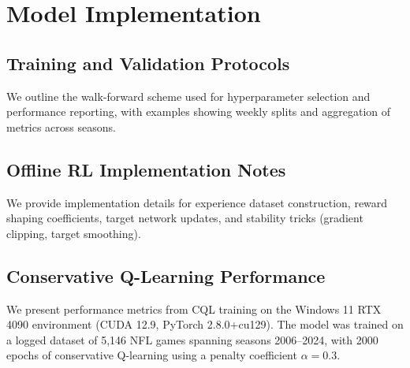 \chapter{Model Implementation}\label{app:models}


\section{Training and Validation Protocols}\label{app:training}
We outline the walk-forward scheme used for hyperparameter selection and performance reporting, with examples showing weekly splits and aggregation of metrics across seasons.

\section{Offline RL Implementation Notes}\label{app:rl-impl}
We provide implementation details for experience dataset construction, reward shaping coefficients, target network updates, and stability tricks (gradient clipping, target smoothing).

\section{Conservative Q-Learning Performance}\label{app:cql-perf}
We present performance metrics from CQL training on the Windows 11 RTX 4090 environment (CUDA 12.9, PyTorch 2.8.0+cu129). The model was trained on a logged dataset of 5,146 NFL games spanning seasons 2006--2024, with 2000 epochs of conservative Q-learning using a penalty coefficient $\alpha=0.3$.


